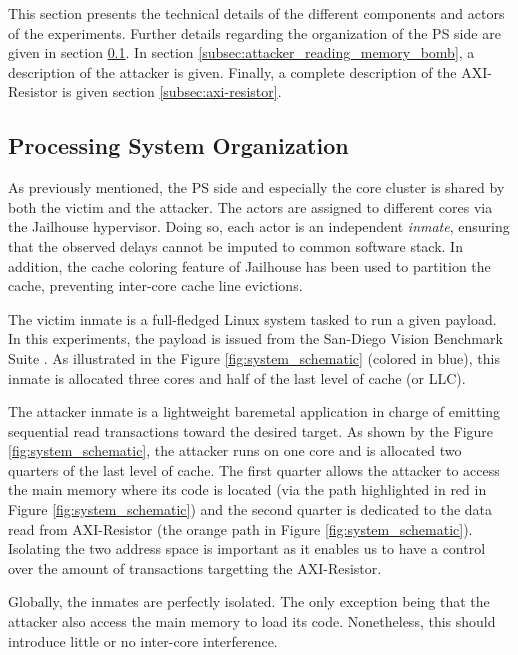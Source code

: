     This section presents the technical details of the different components and actors of the experiments. Further details regarding the organization of the PS side are given in section \ref{subsec:processing_system_organization}. In section \ref{subsec:attacker_reading_memory_bomb}, a description of the attacker is given. Finally, a complete description of the AXI-Resistor is given section \ref{subsec:axi-resistor}.

    \subsection{Processing System Organization}
        \label{subsec:processing_system_organization}
        As previously mentioned, the PS side and especially the core cluster is shared by both the victim and the attacker. The actors are assigned to different cores via the Jailhouse hypervisor\cite{jailhouse}. Doing so, each actor is an independent \emph{inmate}, ensuring that the observed delays cannot be imputed to common software stack. In addition, the cache coloring feature of Jailhouse has been used to partition the cache, preventing inter-core cache line evictions.

        The victim inmate is a full-fledged Linux system tasked to run a given payload. In this experiments, the payload is issued from the San-Diego Vision Benchmark Suite \cite{SD-VBS}. As illustrated in the Figure \ref{fig:system_schematic} (colored in blue), this inmate is allocated three cores and half of the last level of cache (or LLC).

        The attacker inmate is a lightweight baremetal application in charge of emitting sequential read transactions toward the desired target. As shown by the Figure \ref{fig:system_schematic}, the attacker runs on one core and is allocated two quarters of the last level of cache. The first quarter allows the attacker to access the main memory where its code is located (via the path highlighted in red in Figure \ref{fig:system_schematic}) and the second quarter is dedicated to the data read from AXI-Resistor (the orange path in Figure \ref{fig:system_schematic}). Isolating the two address space is important as it enables us to have a control over the amount of transactions targetting the AXI-Resistor.

        Globally, the inmates are perfectly isolated. The only exception being that the attacker also access the main memory to load its code. Nonetheless, this should introduce little or no inter-core interference.

